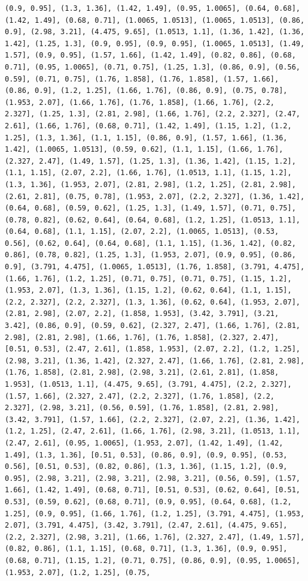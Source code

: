 \documentclass[12pt,fleqn]{article}\usepackage{../common}
\begin{document}
\begin{verbatim}
(0.9, 0.95], (1.3, 1.36], (1.42, 1.49], (0.95, 1.0065], (0.64, 0.68], (1.42, 1.49], (0.68, 0.71], (1.0065, 1.0513], (1.0065, 1.0513], (0.86, 0.9], (2.98, 3.21], (4.475, 9.65], (1.0513, 1.1], (1.36, 1.42], (1.36, 1.42], (1.25, 1.3], (0.9, 0.95], (0.9, 0.95], (1.0065, 1.0513], (1.49, 1.57], (0.9, 0.95], (1.57, 1.66], (1.42, 1.49], (0.82, 0.86], (0.68, 0.71], (0.95, 1.0065], (0.71, 0.75], (1.25, 1.3], (0.86, 0.9], (0.56, 0.59], (0.71, 0.75], (1.76, 1.858], (1.76, 1.858], (1.57, 1.66], (0.86, 0.9], (1.2, 1.25], (1.66, 1.76], (0.86, 0.9], (0.75, 0.78], (1.953, 2.07], (1.66, 1.76], (1.76, 1.858], (1.66, 1.76], (2.2, 2.327], (1.25, 1.3], (2.81, 2.98], (1.66, 1.76], (2.2, 2.327], (2.47, 2.61], (1.66, 1.76], (0.68, 0.71], (1.42, 1.49], (1.15, 1.2], (1.2, 1.25], (1.3, 1.36], (1.1, 1.15], (0.86, 0.9], (1.57, 1.66], (1.36, 1.42], (1.0065, 1.0513], (0.59, 0.62], (1.1, 1.15], (1.66, 1.76], (2.327, 2.47], (1.49, 1.57], (1.25, 1.3], (1.36, 1.42], (1.15, 1.2], (1.1, 1.15], (2.07, 2.2], (1.66, 1.76], (1.0513, 1.1], (1.15, 1.2], (1.3, 1.36], (1.953, 2.07], (2.81, 2.98], (1.2, 1.25], (2.81, 2.98], (2.61, 2.81], (0.75, 0.78], (1.953, 2.07], (2.2, 2.327], (1.36, 1.42], (0.64, 0.68], (0.59, 0.62], (1.25, 1.3], (1.49, 1.57], (0.71, 0.75], (0.78, 0.82], (0.62, 0.64], (0.64, 0.68], (1.2, 1.25], (1.0513, 1.1], (0.64, 0.68], (1.1, 1.15], (2.07, 2.2], (1.0065, 1.0513], (0.53, 0.56], (0.62, 0.64], (0.64, 0.68], (1.1, 1.15], (1.36, 1.42], (0.82, 0.86], (0.78, 0.82], (1.25, 1.3], (1.953, 2.07], (0.9, 0.95], (0.86, 0.9], (3.791, 4.475], (1.0065, 1.0513], (1.76, 1.858], (3.791, 4.475], (1.66, 1.76], (1.2, 1.25], (0.71, 0.75], (0.71, 0.75], (1.15, 1.2], (1.953, 2.07], (1.3, 1.36], (1.15, 1.2], (0.62, 0.64], (1.1, 1.15], (2.2, 2.327], (2.2, 2.327], (1.3, 1.36], (0.62, 0.64], (1.953, 2.07], (2.81, 2.98], (2.07, 2.2], (1.858, 1.953], (3.42, 3.791], (3.21, 3.42], (0.86, 0.9], (0.59, 0.62], (2.327, 2.47], (1.66, 1.76], (2.81, 2.98], (2.81, 2.98], (1.66, 1.76], (1.76, 1.858], (2.327, 2.47], [0.51, 0.53], (2.47, 2.61], (1.858, 1.953], (2.07, 2.2], (1.2, 1.25], (2.98, 3.21], (1.36, 1.42], (2.327, 2.47], (1.66, 1.76], (2.81, 2.98], (1.76, 1.858], (2.81, 2.98], (2.98, 3.21], (2.61, 2.81], (1.858, 1.953], (1.0513, 1.1], (4.475, 9.65], (3.791, 4.475], (2.2, 2.327], (1.57, 1.66], (2.327, 2.47], (2.2, 2.327], (1.76, 1.858], (2.2, 2.327], (2.98, 3.21], (0.56, 0.59], (1.76, 1.858], (2.81, 2.98], (3.42, 3.791], (1.57, 1.66], (2.2, 2.327], (2.07, 2.2], (1.36, 1.42], (1.2, 1.25], (2.47, 2.61], (1.66, 1.76], (2.98, 3.21], (1.0513, 1.1], (2.47, 2.61], (0.95, 1.0065], (1.953, 2.07], (1.42, 1.49], (1.42, 1.49], (1.3, 1.36], [0.51, 0.53], (0.86, 0.9], (0.9, 0.95], (0.53, 0.56], [0.51, 0.53], (0.82, 0.86], (1.3, 1.36], (1.15, 1.2], (0.9, 0.95], (2.98, 3.21], (2.98, 3.21], (2.98, 3.21], (0.56, 0.59], (1.57, 1.66], (1.42, 1.49], (0.68, 0.71], [0.51, 0.53], (0.62, 0.64], [0.51, 0.53], (0.59, 0.62], (0.68, 0.71], (0.9, 0.95], (0.64, 0.68], (1.2, 1.25], (0.9, 0.95], (1.66, 1.76], (1.2, 1.25], (3.791, 4.475], (1.953, 2.07], (3.791, 4.475], (3.42, 3.791], (2.47, 2.61], (4.475, 9.65], (2.2, 2.327], (2.98, 3.21], (1.66, 1.76], (2.327, 2.47], (1.49, 1.57], (0.82, 0.86], (1.1, 1.15], (0.68, 0.71], (1.3, 1.36], (0.9, 0.95], (0.68, 0.71], (1.15, 1.2], (0.71, 0.75], (0.86, 0.9], (0.95, 1.0065], (1.953, 2.07], (1.2, 1.25], (0.75, 
\end{verbatim}
\end{document}
